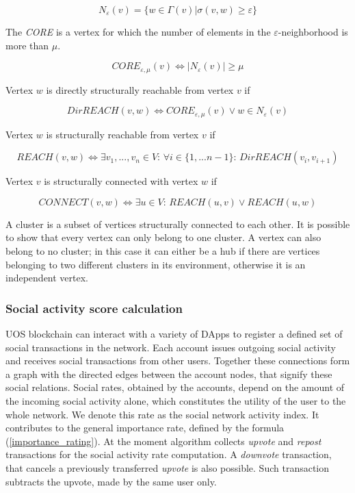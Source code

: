 \documentclass[a4paper,12pt]{article}
\begin{document}
$$
N_{\varepsilon}(v) = \{ w \in \Gamma(v) | \sigma(v,w) \ge \varepsilon \}
$$

The \textit{CORE} is a vertex for which the number of elements in the $\varepsilon$-neighborhood is more than $\mu$.

$$
CORE_{\varepsilon,\mu}(v) \Leftrightarrow |N_{\varepsilon} (v)| \ge \mu
$$

Vertex $w$ is directly structurally reachable from vertex $v$ if



$$
DirREACH(v,w) \Leftrightarrow CORE_{\varepsilon,\mu}(v) \vee w \in N_{\varepsilon}(v)
$$

Vertex $w$ is structurally reachable from vertex $v$ if


$$
REACH(v,w) \Leftrightarrow \exists v_1,...,v_n \in V \text{: } \forall i \in \{1,...n-1\} \text{: } DirREACH(v_i,v_{i+1})
$$

Vertex $v$ is structurally connected with vertex $w$ if



$$
CONNECT(v,w) \Leftrightarrow \exists u \in V\text{: } REACH(u,v) \vee REACH(u,w)
$$

A cluster is a subset of vertices structurally connected to each other. It is possible to show that every vertex can only belong to one cluster. A vertex can also belong to no cluster; in this case it can either be a hub if there are vertices belonging to two different clusters in its environment, otherwise it is an independent vertex.




\subsubsection{Social activity score calculation}

U{\degree}OS blockchain can interact with a variety of DApps to register a defined set of social transactions in the network. Each account issues outgoing social activity and receives social transactions from other users. Together these connections form a graph with the directed edges between the account nodes, that signify these social relations. Social rates, obtained by the accounts, depend on the amount of the incoming social activity alone, which constitutes the utility of the user to the whole network. We denote this rate as the social network activity index. It contributes to the general importance rate, defined by the formula (\ref{importance_rating}). At the moment algorithm collects \emph{upvote} and \emph{repost} transactions for the social activity rate computation. A \emph{downvote} transaction, that cancels a previously transferred \emph{upvote} is also possible. Such transaction subtracts the upvote, made by the same user only.
\end{document}

